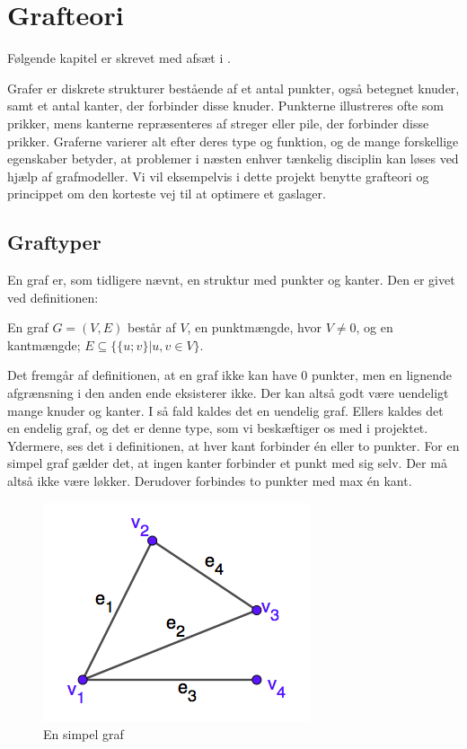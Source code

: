\chapter{Grafteori}
Følgende kapitel er skrevet med afsæt i \citep{dmat}.

Grafer er diskrete strukturer bestående af et antal punkter, også betegnet knuder, samt et antal kanter, der forbinder disse knuder. Punkterne illustreres ofte som prikker, mens kanterne repræsenteres af streger eller pile, der forbinder disse prikker. Graferne varierer alt efter deres type og funktion, og de mange forskellige egenskaber betyder, at problemer i næsten enhver tænkelig disciplin kan løses ved hjælp af grafmodeller. Vi vil eksempelvis i dette projekt benytte grafteori og princippet om den korteste vej til at optimere et gaslager.
\section{Graftyper}
En graf er, som tidligere nævnt, en struktur med punkter og kanter. Den er givet ved definitionen:
\begin{definition}
[Graf] 
En graf $G=(V,E)$ består af $V$, en punktmængde, hvor $V\neq0$, og en kantmængde; $E \subseteq \{\{u;v\}|u,v \in V\}$.
\end{definition}
Det fremgår af definitionen, at en graf ikke kan have 0 punkter, men en lignende afgrænsning i den anden ende eksisterer ikke. Der kan altså godt være uendeligt mange knuder og kanter. I så fald kaldes det en uendelig graf. Ellers kaldes det en endelig graf, og det er denne type, som vi beskæftiger os med i projektet.
Ydermere, ses det i definitionen, at hver kant forbinder én eller to punkter. For en simpel graf gælder det, at ingen kanter forbinder et punkt med sig selv. Der må altså ikke være løkker. Derudover forbindes to punkter med max én kant.
\begin{figure}[H]
\centering
\includegraphics[scale=0.5]{fig/img/simpel_graf.png}
\caption{En simpel graf}
\label{fig:simpel}
\end{figure}

